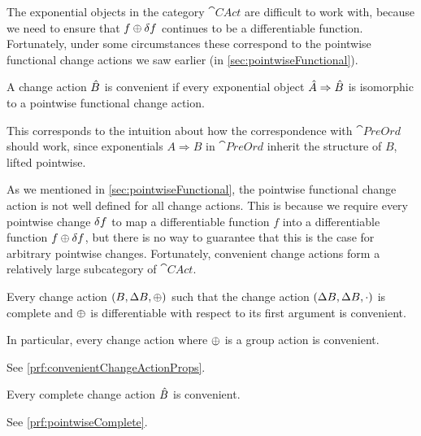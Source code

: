 The exponential objects in the category $\cat{CAct}$ are difficult to work with,
because we need to ensure that $f \oplus \delta f$ continues to be a
differentiable function. Fortunately, under some circumstances these correspond
to the pointwise functional change actions we saw earlier (in \cref{sec:pointwiseFunctional}).

\begin{defn}
  \label{def:convenientChangeActions}
  A change action $\hat{B}$ is convenient if every exponential object
  ${\hat{A}} \Rightarrow {\hat{B}}$ is isomorphic to a pointwise functional change action.
\end{defn}

This corresponds to the intuition about how the correspondence with
$\cat{PreOrd}$ should work, since exponentials $A \Rightarrow B$ in $\cat{PreOrd}$ inherit the
structure of $B$, lifted pointwise.

As we mentioned in \cref{sec:pointwiseFunctional}, 
the pointwise functional change action is not well defined for all change actions.
This is because we require every pointwise change $\delta f$ to map a differentiable
function $f$ into a differentiable function $f \oplus \delta f$, but there is no way
to guarantee that this is the case for arbitrary pointwise changes.
Fortunately, convenient change actions form a relatively large subcategory of $\cat{CAct}$.

\begin{prop}[name=Convenient change actions, restate=convenientChangeActionProps]
  \label{prop:convenientChangeActionProps}
  Every change action $(B,\Delta B,\oplus)$ such that the change action
  $(\Delta B,\Delta B,\cdot)$ is complete and $\oplus$ is differentiable with
  respect to its first argument is convenient.

  In particular, every change action where $\oplus$ is a group action is convenient.
\end{prop}
\ifproofs
  See \cref{prf:convenientChangeActionProps}.
\fi

\begin{prop}[name=Complete change actions are convenient, restate=pointwiseComplete]
  \label{prop:pointwiseComplete}
   Every complete change action $\hat{B}$ is convenient.
\end{prop}
\ifproofs
  See \cref{prf:pointwiseComplete}.
\fi

